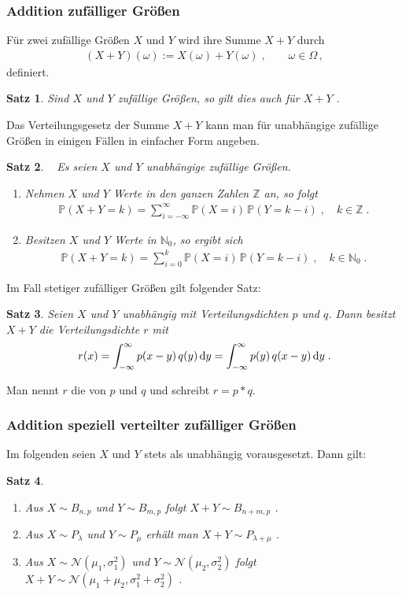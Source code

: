 \documentclass[ngerman,draft,parskip=half,twoside]{scrartcl}
\newtheorem{thm}{Satz}[section]
\newcommand*{\highl}[2][]{\textbf{\boldmath{#2}}%
  \ifthenelse{\equal{#1}{}}{\index{#2}}{\index{#1}}%
}
\newcommand*{\N}{\mathbb{N}}      %
\newcommand*{\Z}{\mathbb{Z}}      %
\newcommand*{\WKM}{\mathbb{P}}      %
\newcommand*{\NormVert}{\mathcal{N}} %
\newcommand*{\diff}[1]{%
  \mathop{\mathrm{\mathstrut d}}%
  \ifx#1(\else%
  \ifx#1[\else%
  \ifx#1\{\else%
    \!%
  \fi\fi\fi#1%
}
\begin{document}
\subsubsection{Addition zufälliger Größen}
Für zwei zufällige Größen $X$  und $Y$ wird ihre Summe $X+Y$ durch
\begin{gather*}
  (X+Y)(\omega):=X(\omega)+Y(\omega)\;,\qquad \omega\in\Omega\,,
\end{gather*}
definiert.
\begin{thm}
Sind $X$ und $Y$ zufällige Größen, so gilt dies auch für $X+Y$ .
\end{thm}
Das Verteilungsgesetz der Summe $X+Y$ kann man für unabhängige zufällige Größen in einigen
Fällen in einfacher Form angeben.
\begin{thm}~
Es seien $X$ und $Y$ unabhängige zufällige Größen.
\begin{enumerate}
\item
Nehmen $X$ und $Y$ Werte in den ganzen Zahlen $\Z$ an, so folgt
  \begin{gather*}
    \WKM(X+Y=k)=\sum_{i=-\infty}^\infty\WKM(X=i)\,\WKM(Y=k-i)\;,\quad k\in \Z\;.
  \end{gather*}
\item
Besitzen $X$ und $Y$ Werte in $\N_0$, so ergibt sich
  \begin{gather*}
    \WKM(X+Y=k)=\sum_{i=0}^k\WKM(X=i)\,\WKM(Y=k-i)\;,\quad k\in \N_0\;.
  \end{gather*}
\end{enumerate}
\end{thm}
Im Fall stetiger zufälliger Größen gilt folgender Satz:
\begin{thm}
Seien $X$ und $Y$ unabhängig mit Verteilungsdichten $p$ und $q$. Dann besitzt $X+Y$
die Verteilungsdichte $r$  mit
  \begin{gather*}
    r(x)=\int_{-\infty}^\infty p(x-y)\,q(y)\diff{y} = \int_{-\infty}^\infty p(y)\,q(x-y)\diff{y} \;.
  \end{gather*}
\end{thm}
Man nennt $r$ die \highl{Faltung} von $p$ und $q$ und schreibt $r=p*q$.
\subsubsection{Addition speziell verteilter zufälliger Größen}
Im folgenden seien $X$ und $Y$ stets als unabhängig vorausgesetzt. Dann gilt:
\begin{thm}~
  \begin{enumerate}[label=(\alph*)]
   \item
Aus $X\sim B_{n,p}$ und $Y\sim B_{m,p}$ folgt $X+Y\sim B_{n+m,p}$  .
   \item
Aus $X\sim P_\lambda$ und $Y\sim P_\mu$ erhält man $X+Y\sim P_{\lambda+\mu}$ .
   \item
Aus $X\sim\NormVert(\mu_1,\sigma_1^2)$ und $Y\sim\NormVert(\mu_2,\sigma_2^2)$ folgt
$X+Y\sim \NormVert(\mu_1+\mu_2,\sigma_1^2+\sigma_2^2)$ .
  \end{enumerate}
\end{thm}
\end{document}
